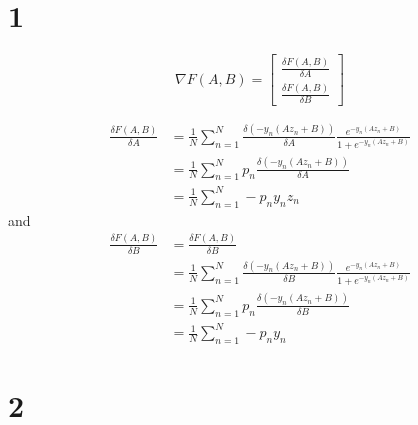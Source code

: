 \documentclass[12pt]{article}
\begin{document}
\maketitle


\section*{1}

$$
\nabla F(A, B)= 
\begin{bmatrix}
    \frac{\delta F(A, B)}{\delta A}  \\
    \frac{\delta F(A, B)}{\delta B} 
\end{bmatrix}
$$

\begin{equation*}
\begin{split}
    \frac{\delta F(A, B)}{\delta A} &= \frac{1}{N} \sum_{n=1}^N \frac{\delta (-y_n(Az_n + B))}{\delta A} \frac{e^{-y_n(Az_n+B)}}{1+ e^{-y_n(Az_n+B)}} \\
    &= \frac{1}{N} \sum_{n=1}^{N} p_n \frac{\delta (-y_n (Az_n + B))}{\delta A} \\
    &= \frac{1}{N} \sum_{n=1}^{N} -p_ny_nz_n
\end{split}
\end{equation*}
and 
\begin{equation*}
\begin{split}
    \frac{\delta F(A, B)}{\delta B} &= \frac{\delta F(A, B)}{\delta B} \\
    &= \frac{1}{N} \sum_{n=1}^{N} \frac{\delta (-y_n (Az_n + B))}{\delta B} \frac{e^{-y_n(Az_n+B)}}{1+ e^{-y_n(Az_n+B)}} \\
    &= \frac{1}{N} \sum_{n=1}^{N} p_n \frac{\delta (-y_n (Az_n + B))}{\delta B} \\
    &= \frac{1}{N} \sum_{n=1}^{N} -p_ny_n
\end{split}
\end{equation*}


\section*{2}
\end{document}
